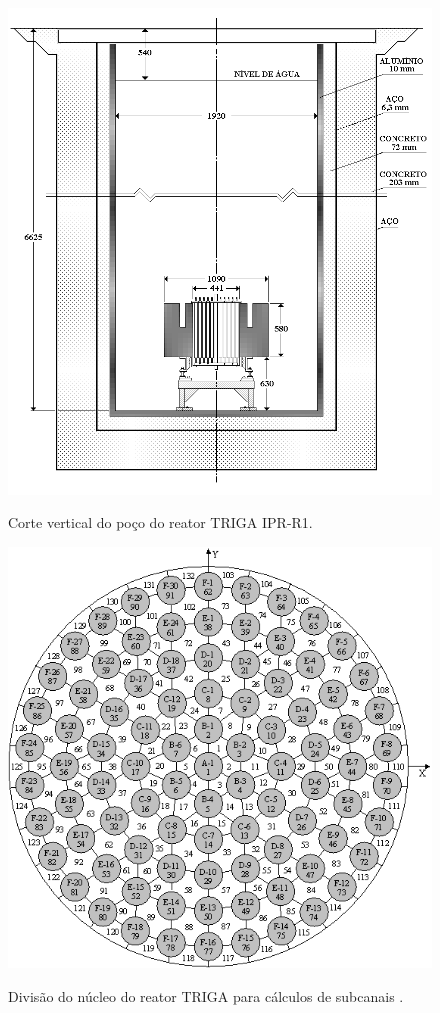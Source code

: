 \begin{figure}[htb]
  \caption{Corte vertical do poço do reator TRIGA IPR-R1.}
  \centering\includegraphics[scale=0.35]{figuras/poco_triga.png}
  \label{fig:poco_triga}
\end{figure}

\begin{figure}[htb]
  \caption[Divisão do núcleo do reator TRIGA para cálculos de subcanais.]{Divisão do núcleo do reator TRIGA para cálculos de subcanais \cite{Veloso2005}.}
  \centering\includegraphics[scale=0.6]{figuras/subcanais_veloso.png}
  \label{fig:subcanais_veloso}
\end{figure}

